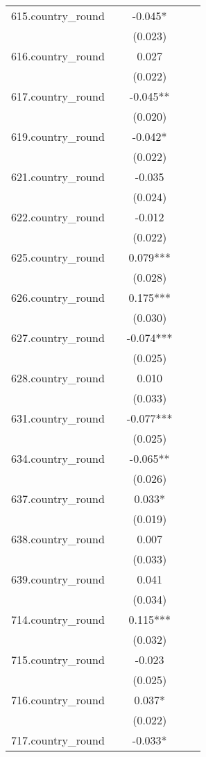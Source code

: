 \documentclass[]{article}
\begin{document}
\begin{tabular}{lcccc}
615.country\_round &  & -0.045* &  &  \\
 &  & (0.023) &  &  \\
616.country\_round &  & 0.027 &  &  \\
 &  & (0.022) &  &  \\
617.country\_round &  & -0.045** &  &  \\
 &  & (0.020) &  &  \\
619.country\_round &  & -0.042* &  &  \\
 &  & (0.022) &  &  \\
621.country\_round &  & -0.035 &  &  \\
 &  & (0.024) &  &  \\
622.country\_round &  & -0.012 &  &  \\
 &  & (0.022) &  &  \\
625.country\_round &  & 0.079*** &  &  \\
 &  & (0.028) &  &  \\
626.country\_round &  & 0.175*** &  &  \\
 &  & (0.030) &  &  \\
627.country\_round &  & -0.074*** &  &  \\
 &  & (0.025) &  &  \\
628.country\_round &  & 0.010 &  &  \\
 &  & (0.033) &  &  \\
631.country\_round &  & -0.077*** &  &  \\
 &  & (0.025) &  &  \\
634.country\_round &  & -0.065** &  &  \\
 &  & (0.026) &  &  \\
637.country\_round &  & 0.033* &  &  \\
 &  & (0.019) &  &  \\
638.country\_round &  & 0.007 &  &  \\
 &  & (0.033) &  &  \\
639.country\_round &  & 0.041 &  &  \\
 &  & (0.034) &  &  \\
714.country\_round &  & 0.115*** &  &  \\
 &  & (0.032) &  &  \\
715.country\_round &  & -0.023 &  &  \\
 &  & (0.025) &  &  \\
716.country\_round &  & 0.037* &  &  \\
 &  & (0.022) &  &  \\
717.country\_round &  & -0.033* &  &  \\

\end{tabular}
\end{document}
